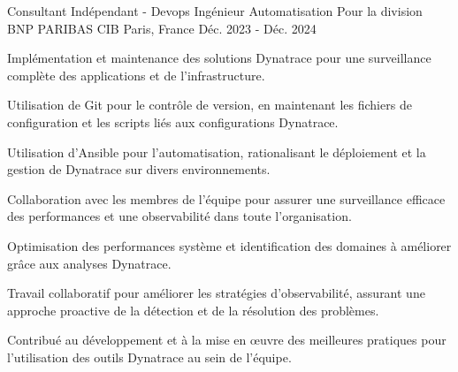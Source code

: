 
\begin{cventries}

  \cventry
    {Consultant Indépendant - Devops Ingénieur Automatisation}  %
    {Pour la division BNP PARIBAS CIB} %
    {Paris, France} %
    {Déc. 2023 - Déc. 2024} %
    {
      \begin{cvitems} %
        \item {Implémentation et maintenance des solutions Dynatrace pour une surveillance complète des applications et de l'infrastructure.}
        \item {Utilisation de Git pour le contrôle de version, en maintenant les fichiers de configuration et les scripts liés aux configurations Dynatrace.}
        \item {Utilisation d'Ansible pour l'automatisation, rationalisant le déploiement et la gestion de Dynatrace sur divers environnements.}
        \item {Collaboration avec les membres de l'équipe pour assurer une surveillance efficace des performances et une observabilité dans toute l'organisation.}
        \item {Optimisation des performances système et identification des domaines à améliorer grâce aux analyses Dynatrace.}
        \item {Travail collaboratif pour améliorer les stratégies d'observabilité, assurant une approche proactive de la détection et de la résolution des problèmes.}
        \item {Contribué au développement et à la mise en œuvre des meilleures pratiques pour l'utilisation des outils Dynatrace au sein de l'équipe.}
      \end{cvitems}
    }



\end{cventries}
